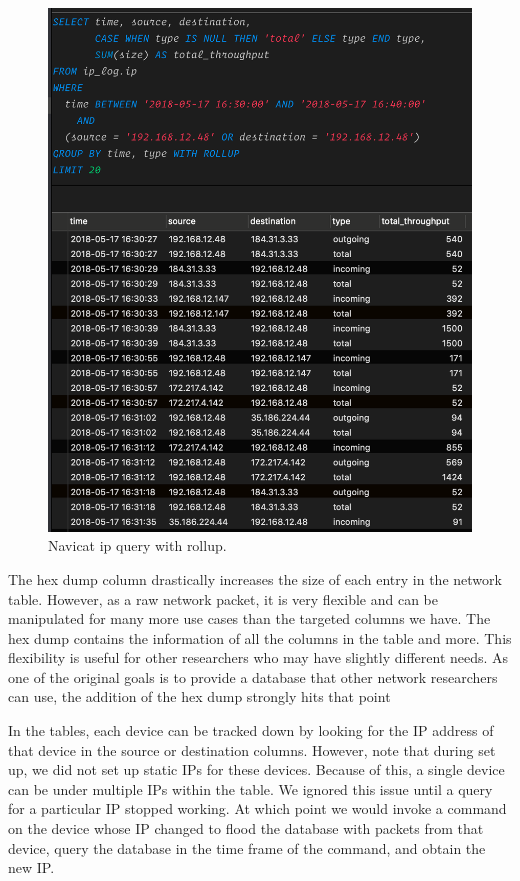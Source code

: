 \begin{figure}[H]
    \centering
    \includegraphics[width=1\textwidth]{figures/navicatRollup.png}
    \caption{Navicat ip query with rollup.}
    \label{fig:navicatRollup}
\end{figure}

The hex dump column drastically increases the size of each entry in the network table. However, as a raw network packet, it is very flexible and can be manipulated for many more use cases than the targeted columns we have. The hex dump contains the information of all the columns in the table and more. This flexibility is useful for other researchers who may have slightly different needs. As one of the original goals is to provide a database that other network researchers can use, the addition of the hex dump strongly hits that point

In the tables, each device can be tracked down by looking for the IP address of that device in the source or destination columns. However, note that during set up, we did not set up static IPs for these devices. Because of this, a single device can be under multiple IPs within the table. We ignored this issue until a query for a particular IP stopped working. At which point we would invoke a command on the device whose IP changed to flood the database with packets from that device, query the database in the time frame of the command, and obtain the new IP.

